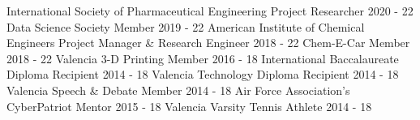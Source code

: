 \begin{cvhonors}

\cvhonor
{International Society of Pharmaceutical Engineering} %
{Project Researcher} %
{} %
{2020 - 22} %
\cvhonor
    {Data Science Society} %
    {Member} %
    {} %
    {2019 - 22} %
\cvhonor
    {American Institute of Chemical Engineers} %
    {Project Manager \& Research Engineer} %
    {} %
    {2018 - 22} %
 \cvhonor
    {Chem-E-Car} %
    {Member} %
    {} %
    {2018 - 22} %
 \cvhonor
    {Valencia 3-D Printing} %
    {Member} %
    {} %
    {2016 - 18} %
  \cvhonor
    {International Baccalaureate} %
    {Diploma Recipient} %
    {} %
    {2014 - 18} %
  \cvhonor
    {Valencia Technology} %
    {Diploma Recipient} %
    {} %
    {2014 - 18} %
    \cvhonor
    {Valencia Speech \& Debate} %
    {Member} %
    {} %
    {2014 - 18} %
\cvhonor
    {Air Force Association's CyberPatriot} %
    {Mentor} %
    {} %
    {2015 - 18} %
  \cvhonor
    {Valencia Varsity Tennis} %
    {Athlete} %
    {} %
    {2014 - 18} %
\end{cvhonors}
